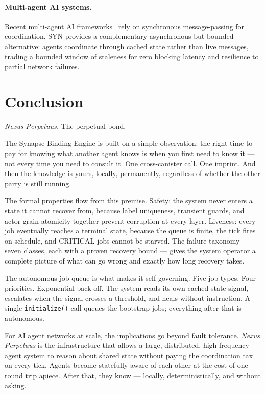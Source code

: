 \documentclass[12pt]{article}
\begin{document}
\paragraph{Multi-agent AI systems.}
Recent multi-agent AI frameworks~\cite{park2023, autogen2023} rely on
synchronous message-passing for coordination.  SYN provides a complementary
asynchronous-but-bounded alternative: agents coordinate through cached state
rather than live messages, trading a bounded window of staleness for zero
blocking latency and resilience to partial network failures.

\section{Conclusion}
\label{sec:conclusion}

\emph{Nexus Perpetuus.}  The perpetual bond.

The Synapse Binding Engine is built on a simple observation: the right time
to pay for knowing what another agent knows is when you first need to know it —
not every time you need to consult it.  One cross-canister call.  One imprint.
And then the knowledge is yours, locally, permanently, regardless of whether
the other party is still running.

The formal properties flow from this premise.  Safety: the system never enters
a state it cannot recover from, because label uniqueness, transient guards, and
actor-grain atomicity together prevent corruption at every layer.  Liveness:
every job eventually reaches a terminal state, because the queue is finite, the
tick fires on schedule, and CRITICAL jobs cannot be starved.  The failure
taxonomy — seven classes, each with a proven recovery bound — gives the system
operator a complete picture of what can go wrong and exactly how long recovery
takes.

The autonomous job queue is what makes it self-governing.  Five job types.
Four priorities.  Exponential back-off.  The system reads its own cached state
signal, escalates when the signal crosses a threshold, and heals without
instruction.  A single \texttt{initialize()} call queues the bootstrap jobs;
everything after that is autonomous.

For AI agent networks at scale, the implications go beyond fault tolerance.
\emph{Nexus Perpetuus} is the infrastructure that allows a large, distributed,
high-frequency agent system to reason about shared state without paying the
coordination tax on every tick.  Agents become statefully aware of each other
at the cost of one round trip apiece.  After that, they know — locally,
deterministically, and without asking.
\end{document}
